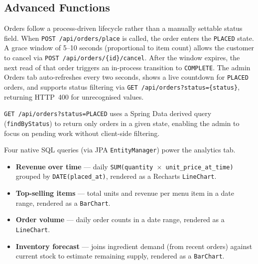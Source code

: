\documentclass[12pt,a4paper]{article}
\begin{document}
\subsection{Advanced Functions}

\begin{description}[style=nextline]
    \item[Order status lifecycle]
    Orders follow a process-driven lifecycle rather than a manually settable
    status field. When \texttt{POST /api/orders/place} is called, the order
    enters the \texttt{PLACED} state. A grace window of 5--10 seconds
    (proportional to item count) allows the customer to cancel via
    \texttt{POST /api/orders/\{id\}/cancel}. After the window expires, the
    next read of that order triggers an in-process transition to
    \texttt{COMPLETE}. The admin Orders tab auto-refreshes every two seconds,
    shows a live countdown for \texttt{PLACED} orders, and supports status
    filtering via \texttt{GET /api/orders?status=\{status\}}, returning
    HTTP~400 for unrecognised values.

    \item[Filtered order queries]
    \texttt{GET /api/orders?status=PLACED} uses a Spring Data derived query
    (\texttt{findByStatus}) to return only orders in a given state, enabling
    the admin to focus on pending work without client-side filtering.

    \item[Analytics dashboard]
    Four native SQL queries (via JPA \texttt{EntityManager}) power the
    analytics tab.
    \begin{itemize}
        \item \textbf{Revenue over time} --- daily \texttt{SUM(quantity
              $\times$ unit\_price\_at\_time)} grouped by
              \texttt{DATE(placed\_at)}, rendered as a Recharts
              \texttt{LineChart}.
        \item \textbf{Top-selling items} --- total units and revenue per menu
              item in a date range, rendered as a \texttt{BarChart}.
        \item \textbf{Order volume} --- daily order counts in a date range,
              rendered as a \texttt{LineChart}.
        \item \textbf{Inventory forecast} --- joins ingredient demand (from
              recent orders) against current stock to estimate remaining supply,
              rendered as a \texttt{BarChart}.
    \end{itemize}


\end{description}
\end{document}

